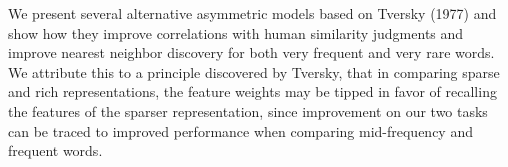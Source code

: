 We present several alternative asymmetric models based on Tversky (1977) and show how they improve correlations with human similarity judgments and improve nearest neighbor discovery for both very frequent and very rare words.  We attribute this to a principle discovered by Tversky, that in comparing sparse and rich representations, the feature weights may be tipped in favor of recalling the features of the sparser representation, since improvement on our two tasks can be traced to improved performance when comparing mid-frequency and frequent words.
